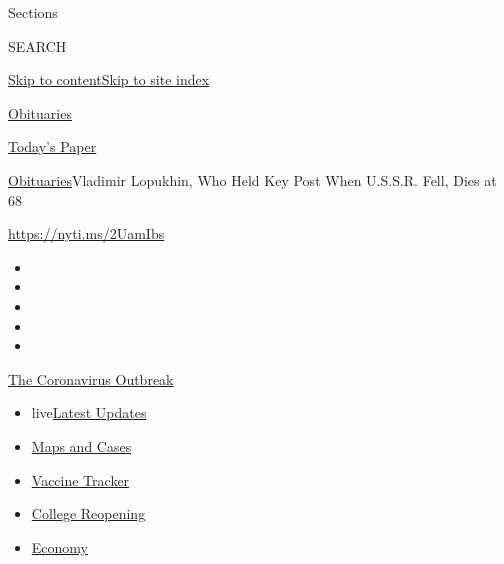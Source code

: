 Sections

SEARCH

\protect\hyperlink{site-content}{Skip to
content}\protect\hyperlink{site-index}{Skip to site index}

\href{https://www.nytimes3xbfgragh.onion/section/obituaries}{Obituaries}

\href{https://myaccount.nytimes3xbfgragh.onion/auth/login?response_type=cookie\&client_id=vi}{}

\href{https://www.nytimes3xbfgragh.onion/section/todayspaper}{Today's
Paper}

\href{/section/obituaries}{Obituaries}\textbar{}Vladimir Lopukhin, Who
Held Key Post When U.S.S.R. Fell, Dies at 68

\url{https://nyti.ms/2UamIbs}

\begin{itemize}
\item
\item
\item
\item
\item
\end{itemize}

\href{https://www.nytimes3xbfgragh.onion/news-event/coronavirus?action=click\&pgtype=Article\&state=default\&region=TOP_BANNER\&context=storylines_menu}{The
Coronavirus Outbreak}

\begin{itemize}
\tightlist
\item
  live\href{https://www.nytimes3xbfgragh.onion/2020/08/04/world/coronavirus-covid-19.html?action=click\&pgtype=Article\&state=default\&region=TOP_BANNER\&context=storylines_menu}{Latest
  Updates}
\item
  \href{https://www.nytimes3xbfgragh.onion/interactive/2020/us/coronavirus-us-cases.html?action=click\&pgtype=Article\&state=default\&region=TOP_BANNER\&context=storylines_menu}{Maps
  and Cases}
\item
  \href{https://www.nytimes3xbfgragh.onion/interactive/2020/science/coronavirus-vaccine-tracker.html?action=click\&pgtype=Article\&state=default\&region=TOP_BANNER\&context=storylines_menu}{Vaccine
  Tracker}
\item
  \href{https://www.nytimes3xbfgragh.onion/2020/08/02/us/covid-college-reopening.html?action=click\&pgtype=Article\&state=default\&region=TOP_BANNER\&context=storylines_menu}{College
  Reopening}
\item
  \href{https://www.nytimes3xbfgragh.onion/live/2020/08/03/business/stock-market-today-coronavirus?action=click\&pgtype=Article\&state=default\&region=TOP_BANNER\&context=storylines_menu}{Economy}
\end{itemize}

